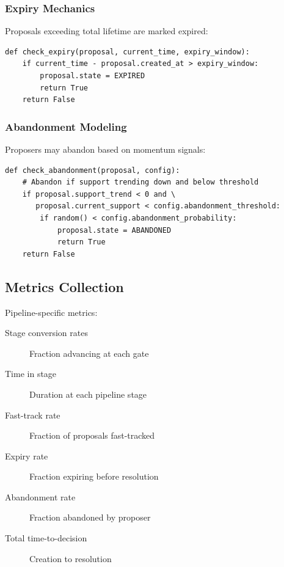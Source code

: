 \subsubsection{Expiry Mechanics}

Proposals exceeding total lifetime are marked expired:

\begin{lstlisting}[caption=Expiry check (pseudocode)]
def check_expiry(proposal, current_time, expiry_window):
    if current_time - proposal.created_at > expiry_window:
        proposal.state = EXPIRED
        return True
    return False
\end{lstlisting}

\subsubsection{Abandonment Modeling}

Proposers may abandon based on momentum signals:

\begin{lstlisting}[caption=Abandonment modeling (pseudocode)]
def check_abandonment(proposal, config):
    # Abandon if support trending down and below threshold
    if proposal.support_trend < 0 and \
       proposal.current_support < config.abandonment_threshold:
        if random() < config.abandonment_probability:
            proposal.state = ABANDONED
            return True
    return False
\end{lstlisting}

\subsection{Metrics Collection}

Pipeline-specific metrics:

\begin{description}
    \item[Stage conversion rates] Fraction advancing at each gate
    \item[Time in stage] Duration at each pipeline stage
    \item[Fast-track rate] Fraction of proposals fast-tracked
    \item[Expiry rate] Fraction expiring before resolution
    \item[Abandonment rate] Fraction abandoned by proposer
    \item[Total time-to-decision] Creation to resolution
\end{description}
